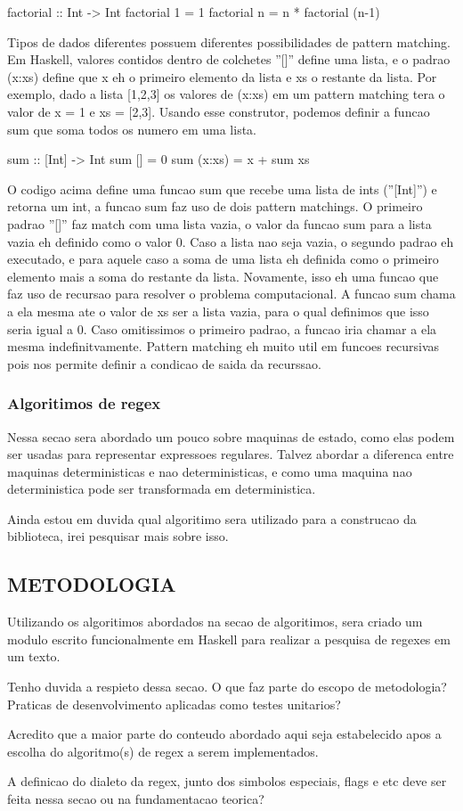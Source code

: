 factorial :: Int -> Int
factorial 1 = 1
factorial n = n * factorial (n-1)

Tipos de dados diferentes possuem diferentes possibilidades de pattern matching.
Em Haskell, valores contidos dentro de colchetes ''[]'' define uma lista, e o padrao (x:xs) define que x eh o primeiro elemento da lista e xs o restante da lista.
Por exemplo, dado a lista [1,2,3] os valores de (x:xs) em um pattern matching tera o valor de x = 1 e xs = [2,3].
Usando esse construtor, podemos definir a funcao sum que soma todos os numero em uma lista.

sum :: [Int] -> Int
sum [] = 0
sum (x:xs) = x + sum xs

O codigo acima define uma funcao sum que recebe uma lista de ints (''[Int]'') e retorna um int, a funcao sum faz uso de dois pattern matchings.
O primeiro padrao ''[]'' faz match com uma lista vazia, o valor da funcao sum para a lista vazia eh definido como o valor 0.
Caso a lista nao seja vazia, o segundo padrao eh executado, e para aquele caso a soma de uma lista eh definida como o primeiro elemento mais a soma do restante da lista.
Novamente, isso eh uma funcao que faz uso de recursao para resolver o problema computacional.
A funcao sum chama a ela mesma ate o valor de xs ser a lista vazia, para o qual definimos que isso seria igual a $0$.
Caso omitissimos o primeiro padrao, a funcao iria chamar a ela mesma indefinitvamente.
Pattern matching eh muito util em funcoes recursivas pois nos permite definir a condicao de saida da recurssao.

\subsubsection{Algoritimos de regex}

Nessa secao sera abordado um pouco sobre maquinas de estado, como elas podem ser usadas para representar expressoes regulares.
Talvez abordar a diferenca entre maquinas deterministicas e nao deterministicas, e como uma maquina nao deterministica pode ser transformada em deterministica.

Ainda estou em duvida qual algoritimo sera utilizado para a construcao da biblioteca, irei pesquisar mais sobre isso.

\subsection{METODOLOGIA}

Utilizando os algoritimos abordados na secao de algoritimos, sera criado um modulo escrito funcionalmente em Haskell para realizar a pesquisa de regexes em um texto.

Tenho duvida a respieto dessa secao. O que faz parte do escopo de metodologia?
Praticas de desenvolvimento aplicadas como testes unitarios?

Acredito que a maior parte do conteudo abordado aqui seja estabelecido apos a escolha do algoritmo(s) de regex a serem implementados.

A definicao do dialeto da regex, junto dos simbolos especiais, flags e etc deve ser feita nessa secao ou na fundamentacao teorica?


